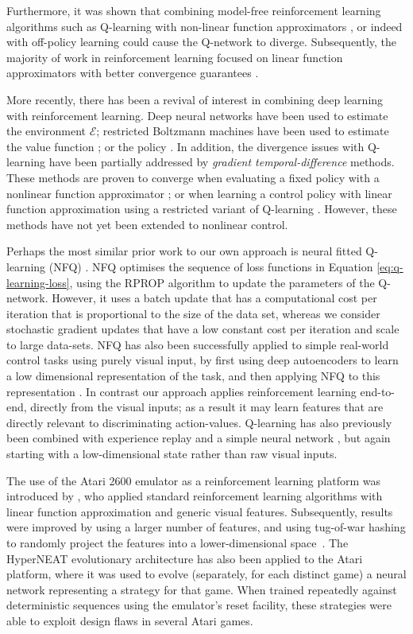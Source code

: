 \documentclass{article} %
\begin{document}
Furthermore, it was shown that combining model-free reinforcement learning algorithms such as Q-learning with non-linear function approximators \cite{tsitsiklis:td-convergence}, or indeed with off-policy learning \cite{baird:residual} could cause the Q-network to diverge. Subsequently, the majority of work in reinforcement learning focused on linear function approximators with better convergence guarantees \cite{tsitsiklis:td-convergence}.

More recently, there has been a revival of interest in combining deep learning with reinforcement learning. Deep neural networks have been used to estimate the environment $\mathcal{E}$; restricted Boltzmann machines have been used to estimate the value function \cite{sallans:rbm}; or the policy \cite{heess:energy-based}. In addition, the divergence issues with Q-learning have been partially addressed by \emph{gradient temporal-difference} methods. These methods are proven to converge when evaluating a fixed policy with a nonlinear function approximator \cite{maei:nonlinear}; or when learning a control policy with linear function approximation using a restricted variant of Q-learning \cite{maei:gq}. However, these methods have not yet been extended to nonlinear control.

Perhaps the most similar prior work to our own approach is neural fitted Q-learning (NFQ) \cite{riedmiller-nfq}. NFQ optimises the sequence of loss functions in Equation \ref{eq:q-learning-loss}, using the RPROP algorithm to update the parameters of the Q-network. However, it uses a batch update that has a computational cost per iteration that is proportional to the size of the data set, whereas we consider stochastic gradient updates that have a low constant cost per iteration and scale to large data-sets. NFQ has also been successfully applied to simple real-world control tasks using purely visual input, by first using deep autoencoders to learn a low dimensional representation of the task, and then applying NFQ to this representation \cite{lange:dfq}. In contrast our approach applies reinforcement learning end-to-end, directly from the visual inputs; as a result it may learn features that are directly relevant to discriminating action-values.  Q-learning has also previously been combined with experience replay and a simple neural network \cite{lin1993reinforcement}, but again starting with a low-dimensional state rather than raw visual inputs.

The use of the Atari 2600 emulator as a reinforcement learning platform was introduced by \cite{bellemare-ale}, who applied standard reinforcement learning algorithms with linear function approximation and generic visual features. Subsequently, results were improved by using a larger number of features, and using tug-of-war hashing to randomly project the features into a lower-dimensional space~\cite{bellemare2012sketch}. The HyperNEAT evolutionary architecture \cite{hausknecht-neuro} has also been applied to the Atari platform, where it was used to evolve (separately, for each distinct game) a neural network representing a strategy for that game. When trained repeatedly against deterministic sequences using the emulator's reset facility, these strategies were able to exploit design flaws in several Atari games. 
\end{document}
